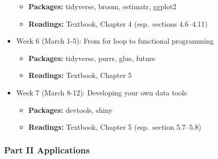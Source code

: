 \documentclass[
]{article}
\providecommand{\tightlist}{%
  \setlength{\itemsep}{0pt}\setlength{\parskip}{0pt}}
\begin{document}
\begin{itemize}
  \begin{itemize}
  \tightlist
  \item
    \textbf{Packages:} tidyverse, broom, estimatr, ggplot2
  \item
    \textbf{Readings:} Textbook, Chapter 4 (esp.~sections 4.6--4.11)
  \end{itemize}
\item
  Week 6 (March 1-5): From for loop to functional programming

  \begin{itemize}
  \tightlist
  \item
    \textbf{Packages:} tidyverse, purrr, glue, future
  \item
    \textbf{Readings:} Textbook, Chapter 5
  \end{itemize}
\item
  Week 7 (March 8-12): Developing your own data tools

  \begin{itemize}
  \tightlist
  \item
    \textbf{Packages:} devtools, shiny
  \item
    \textbf{Readings:} Textbook, Chapter 5 (esp.~section 5.7--5.8)
  \end{itemize}
\end{itemize}

\hypertarget{part-ii-applications-1}{%
\subsubsection{Part II Applications}\label{part-ii-applications-1}}
\end{document}
